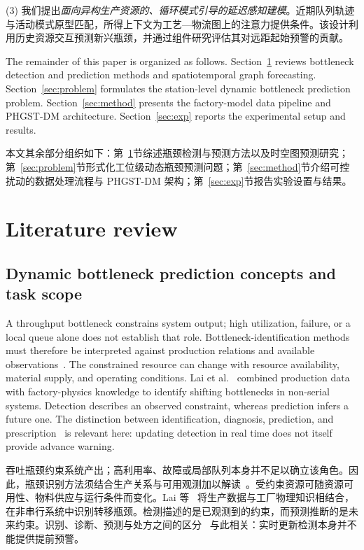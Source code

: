 \documentclass[a4paper,fleqn]{cas-dc}
\newcommand{\zhpara}[1]{%
  \par\begingroup\small\color{black!72}\noindent #1\par\endgroup}
\begin{document}
\zhpara{(3) 我们提出\emph{面向异构生产资源的、循环模式引导的延迟感知建模}。近期队列轨迹与活动模式原型匹配，所得上下文为工艺—物流图上的注意力提供条件。该设计利用历史资源交互预测新兴瓶颈，并通过组件研究评估其对远距起始预警的贡献。}


The remainder of this paper is organized as follows. Section~\ref{sec:review} reviews bottleneck detection and prediction methods and spatiotemporal graph forecasting. Section~\ref{sec:problem} formulates the station-level dynamic bottleneck prediction problem. Section~\ref{sec:method} presents the factory-model data pipeline and PHGST-DM architecture. Section~\ref{sec:exp} reports the experimental setup and results.

\zhpara{本文其余部分组织如下：第~\ref{sec:review}节综述瓶颈检测与预测方法以及时空图预测研究；第~\ref{sec:problem}节形式化工位级动态瓶颈预测问题；第~\ref{sec:method}节介绍可控扰动的数据处理流程与 PHGST-DM 架构；第~\ref{sec:exp}节报告实验设置与结果。}


\section{Literature review} \label{sec:review}

\subsection{Dynamic bottleneck prediction concepts and task scope}

A throughput bottleneck constrains system output; high utilization, failure, or a local queue alone does not establish that role. Bottleneck-identification methods must therefore be interpreted against production relations and available observations~\cite{subramaniyan2023throughput}. The constrained resource can change with resource availability, material supply, and operating conditions. Lai et al.~\cite{lai2021data} combined production data with factory-physics knowledge to identify shifting bottlenecks in non-serial systems. Detection describes an observed constraint, whereas prediction infers a future one. The distinction between identification, diagnosis, prediction, and prescription~\cite{subramaniyan2021ai} is relevant here: updating detection in real time does not itself provide advance warning.

\zhpara{吞吐瓶颈约束系统产出；高利用率、故障或局部队列本身并不足以确立该角色。因此，瓶颈识别方法须结合生产关系与可用观测加以解读~\cite{subramaniyan2023throughput}。受约束资源可随资源可用性、物料供应与运行条件而变化。Lai 等~\cite{lai2021data} 将生产数据与工厂物理知识相结合，在非串行系统中识别转移瓶颈。检测描述的是已观测到的约束，而预测推断的是未来约束。识别、诊断、预测与处方之间的区分~\cite{subramaniyan2021ai} 与此相关：实时更新检测本身并不能提供提前预警。}
\end{document}
